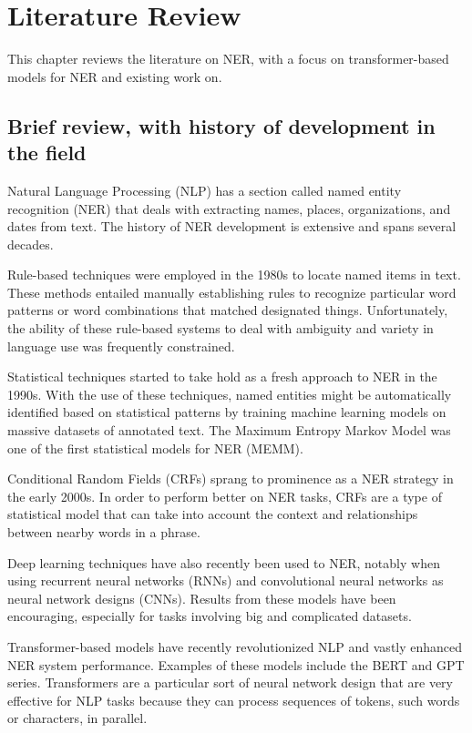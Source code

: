 \documentclass[a4paper,12pt]{report}
\begin{document}
\chapter{Literature Review}\label{cap:literature}
This chapter reviews the literature on NER, with a focus on transformer-based models for NER and existing work on.
\section{Brief review, with history of development in the field}
Natural Language Processing (NLP) has a section called named entity recognition (NER) that deals with extracting names, places, organizations, and dates from text. The history of NER development is extensive and spans several decades.
\par
Rule-based techniques were employed in the 1980s to locate named items in text. These methods entailed manually establishing rules to recognize particular word patterns or word combinations that matched designated things. Unfortunately, the ability of these rule-based systems to deal with ambiguity and variety in language use was frequently constrained.
\par
Statistical techniques started to take hold as a fresh approach to NER in the 1990s. With the use of these techniques, named entities might be automatically identified based on statistical patterns by training machine learning models on massive datasets of annotated text. The Maximum Entropy Markov Model was one of the first statistical models for NER (MEMM).
\par
Conditional Random Fields (CRFs) sprang to prominence as a NER strategy in the early 2000s. In order to perform better on NER tasks, CRFs are a type of statistical model that can take into account the context and relationships between nearby words in a phrase.
\par
Deep learning techniques have also recently been used to NER, notably when using recurrent neural networks (RNNs) and convolutional neural networks as neural network designs (CNNs). Results from these models have been encouraging, especially for tasks involving big and complicated datasets.
\par 
Transformer-based models have recently revolutionized NLP and vastly enhanced NER system performance. Examples of these models include the BERT and GPT series. Transformers are a particular sort of neural network design that are very effective for NLP tasks because they can process sequences of tokens, such words or characters, in parallel.
\end{document}
